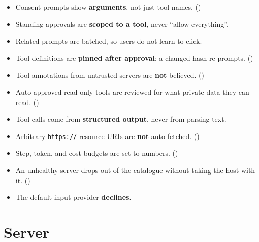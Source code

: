 \begin{itemize}[leftmargin=1.6em, itemsep=3pt]
\item[$\square$] Consent prompts show \textbf{arguments}, not just tool names.
()
\item[$\square$] Standing approvals are \textbf{scoped to a tool}, never
``allow everything''.
\item[$\square$] Related prompts are batched, so users do not learn to click.
\item[$\square$] Tool definitions are \textbf{pinned after approval}; a changed
hash re-prompts. ()
\item[$\square$] Tool annotations from untrusted servers are \textbf{not}
believed. ()
\item[$\square$] Auto-approved read-only tools are reviewed for what private data
they can read. ()
\item[$\square$] Tool calls come from \textbf{structured output}, never from
parsing text.
\item[$\square$] Arbitrary \texttt{https://} resource URIs are \textbf{not}
auto-fetched. ()
\item[$\square$] Step, token, and cost budgets are set to numbers.
()
\item[$\square$] An unhealthy server drops out of the catalogue without taking
the host with it. ()
\item[$\square$] The default input provider \textbf{declines}.
\end{itemize}

\section{Server}

